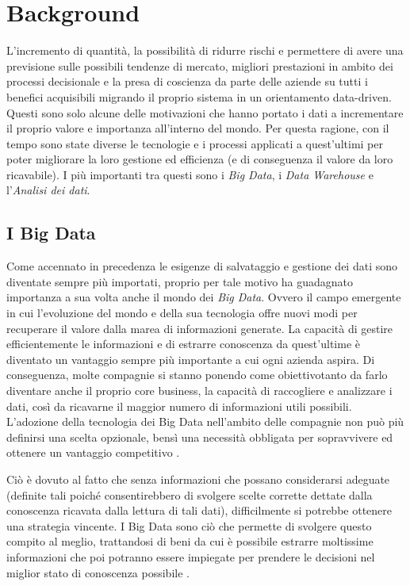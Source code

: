 \chapter{Background}
\label{ch:Background}

L'incremento di quantità, la possibilità di ridurre rischi e permettere di avere una previsione sulle possibili tendenze di mercato, migliori prestazioni in ambito dei processi decisionale e la presa di coscienza da parte delle aziende su tutti i benefici acquisibili migrando il proprio sistema in un orientamento data-driven. Questi sono solo alcune delle motivazioni che hanno portato i dati a incrementare il proprio valore e importanza all'interno del mondo. Per questa ragione, con il tempo sono state diverse le tecnologie e i processi applicati a quest'ultimi per poter migliorare la loro gestione ed efficienza (e di conseguenza il valore da loro ricavabile). I più importanti tra questi sono i \textit{Big Data}, i \textit{Data Warehouse} e l'\textit{Analisi dei dati}.

\section{I Big Data}

Come accennato in precedenza le esigenze di salvataggio e gestione dei dati sono diventate sempre più importati, proprio per tale motivo ha guadagnato importanza a sua volta anche il mondo dei \textit{Big Data}. Ovvero il campo emergente in cui l'evoluzione del mondo e della sua tecnologia offre nuovi modi per recuperare il valore dalla marea di informazioni generate. La capacità di gestire efficientemente le informazioni e di estrarre conoscenza da quest'ultime è diventato un vantaggio sempre più importante a cui ogni azienda aspira. Di conseguenza, molte compagnie si stanno ponendo come obiettivotanto da farlo diventare anche il proprio core business, la capacità di raccogliere e analizzare i dati, così da ricavarne il maggior numero di informazioni utili possibili. L'adozione della tecnologia dei Big Data nell'ambito delle compagnie non può più definirsi una scelta opzionale, bensì una necessità obbligata per sopravvivere ed ottenere un vantaggio competitivo \cite{new_horizon_for_a_data_driven_economy}.

Ciò è dovuto al fatto che senza informazioni che possano considerarsi adeguate (definite tali poiché consentirebbero di svolgere scelte corrette dettate dalla conoscenza ricavata dalla lettura di tali dati), difficilmente si potrebbe ottenere una strategia vincente. I Big Data sono ciò che permette di svolgere questo compito al meglio, trattandosi di beni da cui è possibile estrarre moltissime informazioni che poi potranno essere impiegate per prendere le decisioni nel miglior stato di conoscenza possibile \cite{iusitinere_big_data}.

